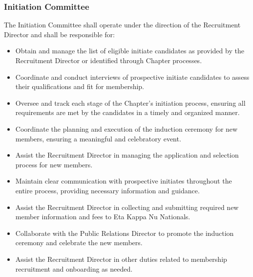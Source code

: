 \documentclass[10pt, oneside]{article}
\begin{document}
\subsubsection{Initiation Committee}
The Initiation Committee shall operate under the direction of the Recruitment Director and shall be responsible for:
\begin{itemize}
    \item Obtain and manage the list of eligible initiate candidates as provided by the Recruitment Director or identified through Chapter processes.
    \item Coordinate and conduct interviews of prospective initiate candidates to assess their qualifications and fit for membership.
    \item Oversee and track each stage of the Chapter's initiation process, ensuring all requirements are met by the candidates in a timely and organized manner.
    \item Coordinate the planning and execution of the induction ceremony for new members, ensuring a meaningful and celebratory event.
    \item Assist the Recruitment Director in managing the application and selection process for new members.
    \item Maintain clear communication with prospective initiates throughout the entire process, providing necessary information and guidance.
    \item Assist the Recruitment Director in collecting and submitting required new member information and fees to Eta Kappa Nu Nationals.
    \item Collaborate with the Public Relations Director to promote the induction ceremony and celebrate the new members.
    \item Assist the Recruitment Director in other duties related to membership recruitment and onboarding as needed.
\end{itemize}
\end{document}
